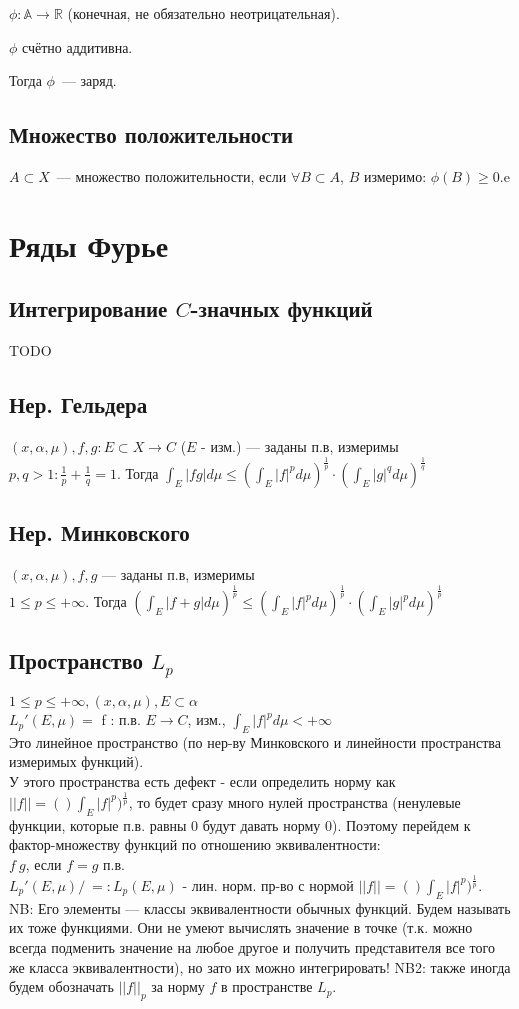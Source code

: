 \documentclass[paper=a4, fontsize=15pt]{article}
\begin{document}
$\phi: \mathds{A} \to \mathds{R}$ (конечная, не обязательно неотрицательная).

$\phi$ счётно аддитивна.

Тогда $\phi$~--- заряд.

\subsection{Множество положительности}
$A \subset X$~--- множество положительности, если
$\forall B \subset A$, $B$ измеримо: $\phi(B) \geq 0$.e

\section{Ряды Фурье}

\subsection{Интегрирование $C$-значных функций}
TODO
\subsection{Нер. Гельдера}
$(x, \alpha, \mu), f, g : E \subset X \rightarrow C$ ($E$ - изм.) --- заданы п.в, измеримы\\
$p, q > 1 : \frac{1}{p} + \frac{1}{q} = 1$. Тогда $\int_E |fg|d\mu \leq (\int_E |f|^p d\mu)^\frac{1}{p} \cdot (\int_E |g|^q d\mu)^\frac{1}{q}$
\subsection{Нер. Минковского}
$(x, \alpha, \mu), f, g $ --- заданы п.в, измеримы\\
$1 \leq p \leq +\infty$. Тогда $(\int_E |f + g|d\mu )^\frac{1}{p} \leq (\int_E |f|^p d\mu)^\frac{1}{p} \cdot (\int_E |g|^p d\mu)^\frac{1}{p}$
\subsection{Пространство $L_p$}
$1 \leq p \leq +\infty, (x, \alpha, \mu), E \subset \alpha$\\
$L_p'(E, \mu) =$ {f : п.в. $E \rightarrow C$, изм., $\int_E |f|^p d\mu < +\infty$}\\
Это линейное пространство (по нер-ву Минковского и линейности пространства измеримых функций).\\
У этого пространства есть дефект - если определить норму как $||f|| = ()\int_E |f|^p)^\frac{1}{p}$, то будет сразу много нулей пространства (ненулевые функции, которые п.в. равны 0 будут давать норму 0).
Поэтому перейдем к фактор-множеству функций по отношению эквивалентности:\\
$f ~ g$, если $f = g$ п.в.\\
$L_p'(E, \mu) /_~ =: L_p(E, \mu)$ - лин. норм. пр-во с нормой $||f|| = ()\int_E |f|^p)^\frac{1}{p}$.\\
NB: Его элементы --- классы эквивалентности обычных функций. Будем называть их тоже функциями. Они не умеют вычислять значение в точке (т.к. можно всегда подменить значение на любое другое и получить представителя все того же класса эквивалентности), но зато их можно интегрировать!
NB2: также иногда будем обозначать $||f||_p$ за норму $f$ в пространстве $L_p$.
\end{document}
